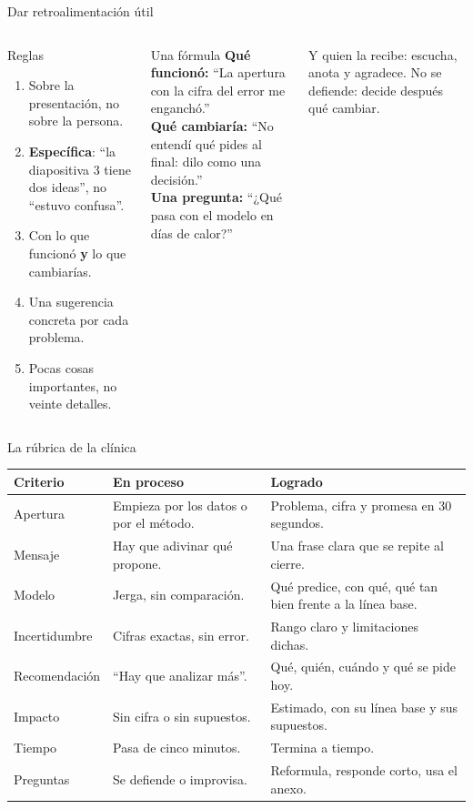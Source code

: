 \documentclass[aspectratio=169,11pt]{beamer}
\begin{document}
\begin{frame}[t]{Dar retroalimentación útil}
  \begin{columns}[T,onlytextwidth]
    \begin{block}{Reglas}
      \footnotesize
      \begin{enumerate}
        \footnotesize
        \item Sobre la presentación, no sobre la persona.
        \item \textbf{Específica}: ``la diapositiva 3 tiene dos ideas'', no
          ``estuvo confusa''.
        \item Con lo que funcionó \textbf{y} lo que cambiarías.
        \item Una sugerencia concreta por cada problema.
        \item Pocas cosas importantes, no veinte detalles.
      \end{enumerate}
    \end{block}
    \begin{exampleblock}{Una fórmula}
      \footnotesize \textbf{Qué funcionó:} ``La apertura con la cifra del
      error me enganchó.''\\[3pt]
      \textbf{Qué cambiaría:} ``No entendí qué pides al final: dilo como
      una decisión.''\\[3pt]
      \textbf{Una pregunta:} ``¿Qué pasa con el modelo en días de
      calor?''
    \end{exampleblock}
    \footnotesize Y quien la recibe: escucha, anota y agradece. No se
    defiende: decide después qué cambiar.
  \end{columns}
\end{frame}

\begin{frame}[t]{La rúbrica de la clínica}
  \footnotesize
  \renewcommand{\arraystretch}{1.22}
  \begin{tabular}{@{}L{2.5cm}L{5.2cm}L{5.4cm}@{}}
    \toprule
    \textbf{Criterio} & \textbf{En proceso} & \textbf{Logrado} \\
    \midrule
    Apertura & Empieza por los datos o por el método. & Problema, cifra y promesa en 30 segundos. \\
    Mensaje & Hay que adivinar qué propone. & Una frase clara que se repite al cierre. \\
    Modelo & Jerga, sin comparación. & Qué predice, con qué, qué tan bien frente a la línea base. \\
    Incertidumbre & Cifras exactas, sin error. & Rango claro y limitaciones dichas. \\
    Recomendación & ``Hay que analizar más''. & Qué, quién, cuándo y qué se pide hoy. \\
    Impacto & Sin cifra o sin supuestos. & Estimado, con su línea base y sus supuestos. \\
    Tiempo & Pasa de cinco minutos. & Termina a tiempo. \\
    Preguntas & Se defiende o improvisa. & Reformula, responde corto, usa el anexo. \\
    \bottomrule
  \end{tabular}
\end{frame}
\end{document}
